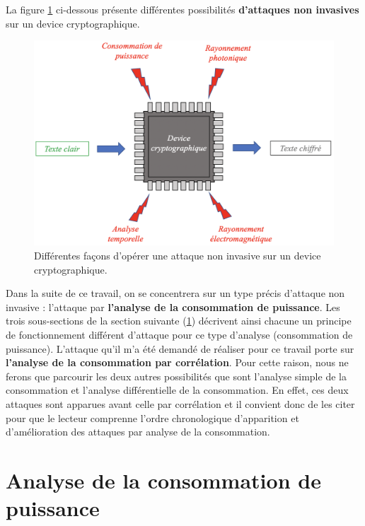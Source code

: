 \documentclass[oneside]{book}
\begin{document}
\newpage

\hspace{-0.5 cm}La figure \ref{fig:attackpassive} ci-dessous présente différentes possibilités \textbf{d'attaques non invasives} sur un device cryptographique.
\begin{figure}[htbp]
    \centering
    \includegraphics[scale=0.7]{image/attackpassive}
    \caption{Différentes façons d'opérer une attaque non invasive sur un device cryptographique.}
    \label{fig:attackpassive}
\end{figure}

Dans la suite de ce travail, on se concentrera sur un type précis d'attaque non invasive : l'attaque par \textbf{l'analyse de la consommation de puissance}. Les trois sous-sections de la section suivante (\ref{sec:PowerGeneral}) décrivent ainsi chacune un principe de fonctionnement différent d'attaque pour ce type d'analyse (consommation de puissance). L'attaque qu'il m'a été demandé de réaliser pour ce travail porte sur \textbf{l'analyse de la consommation par corrélation}. Pour cette raison, nous ne ferons que parcourir les deux autres possibilités que sont l'analyse simple de la consommation et l'analyse différentielle de la consommation. En effet, ces deux attaques sont apparues avant celle par corrélation et il convient donc de les citer pour que le lecteur comprenne l'ordre chronologique d'apparition et d'amélioration des attaques par analyse de la consommation.

\newpage

\section{Analyse de la consommation de puissance}
\label{sec:PowerGeneral}
\end{document}
